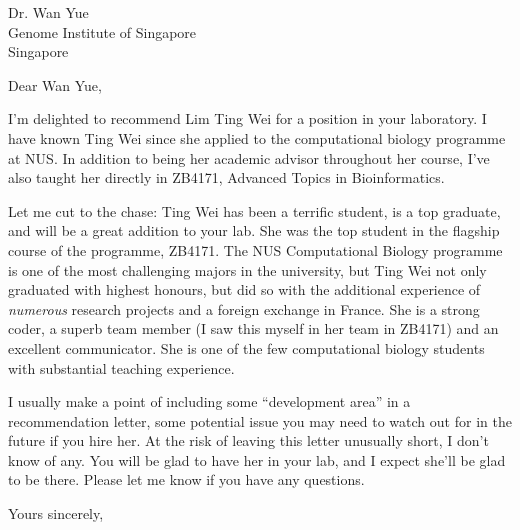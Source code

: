 \documentclass[12pt]{nusletter}
\date{\today}
\newcommand{\UniAddress}{ Dr. Wan Yue\\
  Genome Institute of Singapore \\
  Singapore
  }
\begin{document}
%
\begin{letter}{\UniAddress}

  \raggedright

  
  \opening{Dear Wan Yue,}

  I'm delighted to recommend Lim Ting Wei for a position in your laboratory. I have
  known Ting Wei since she applied to the computational biology programme at NUS. In addition to
  being her academic advisor throughout her course, I've also taught her directly in ZB4171,
  Advanced Topics in Bioinformatics. 

  Let me cut to the chase: Ting Wei has been a terrific student, is a top graduate, and will be a
  great addition to your lab. She was the top student in the flagship course of the programme,
  ZB4171. The NUS Computational Biology programme is one of the most challenging majors in the
  university, but Ting Wei not only graduated with highest honours, but did so with the additional
  experience of \emph{numerous} research projects and a foreign exchange in France. She is a strong
  coder, a superb team member (I saw this myself in her team in ZB4171) and an excellent communicator. She
  is one of the few computational biology students with substantial teaching experience.

  I usually make a point of including some ``development area'' in a recommendation letter, some
  potential issue you may need to watch out for in the future if you hire her. At the risk of leaving
  this letter unusually short, I don't know of any. You will be glad to have her in your lab, and I
  expect she'll be glad to be there.  Please let me know if you have any questions.


 \closing{Yours sincerely,\vspace{0.5in}}

\end{letter}%
\end{document}
